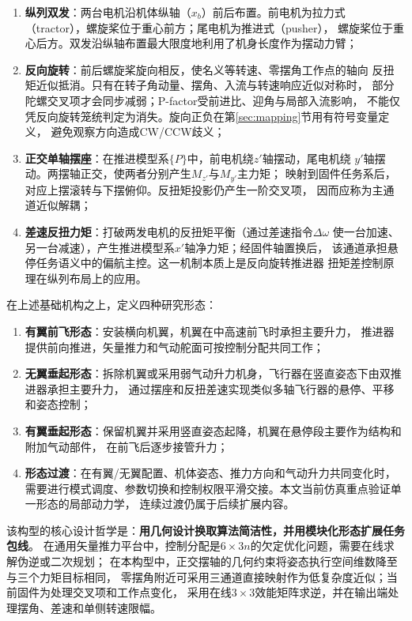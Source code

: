 \begin{enumerate}[label=(\arabic*)]
    \item \textbf{纵列双发}：两台电机沿机体纵轴（$x_b$）前后布置。前电机为拉力式
          （tractor），螺旋桨位于重心前方；尾电机为推进式（pusher），
          螺旋桨位于重心后方。双发沿纵轴布置最大限度地利用了机身长度作为摆动力臂；
    \item \textbf{反向旋转}：前后螺旋桨旋向相反，使名义等转速、零摆角工作点的轴向
          反扭矩近似抵消。只有在转子角动量、摆角、入流与转速响应近似对称时，
          部分陀螺交叉项才会同步减弱；P-factor受前进比、迎角与局部入流影响，
          不能仅凭反向旋转笼统判定为消失。旋向正负在第\ref{sec:mapping}节用有符号变量定义，
          避免观察方向造成CW/CCW歧义；
    \item \textbf{正交单轴摆座}：在推进模型系$\{P\}$中，前电机绕$z'$轴摆动，尾电机绕
          $y'$轴摆动。两摆轴正交，使两者分别产生$M_{z'}$与$M_{y'}$主力矩；
          映射到固件任务系后，对应上摆滚转与下摆俯仰。反扭矩投影仍产生一阶交叉项，
          因而应称为主通道近似解耦；
    \item \textbf{差速反扭力矩}：打破两发电机的反扭矩平衡（通过差速指令$\Delta\omega$
          使一台加速、另一台减速），产生推进模型系$x'$轴净力矩；经固件轴置换后，
          该通道承担悬停任务语义中的偏航主控。这一机制本质上是反向旋转推进器
          扭矩差控制原理在纵列布局上的应用。
\end{enumerate}

在上述基础机构之上，定义四种研究形态：
\begin{enumerate}[label=(\alph*)]
    \item \textbf{有翼前飞形态}：安装横向机翼，机翼在中高速前飞时承担主要升力，
          推进器提供前向推进，矢量推力和气动舵面可按控制分配共同工作；
    \item \textbf{无翼垂起形态}：拆除机翼或采用弱气动升力机身，飞行器在竖直姿态下由双推进器承担主要升力，
          通过摆座和反扭差速实现类似多轴飞行器的悬停、平移和姿态控制；
    \item \textbf{有翼垂起形态}：保留机翼并采用竖直姿态起降，机翼在悬停段主要作为结构和附加气动部件，
          在前飞后逐步接管升力；
    \item \textbf{形态过渡}：在有翼/无翼配置、机体姿态、推力方向和气动升力共同变化时，
          需要进行模式调度、参数切换和控制权限平滑交接。本文当前仿真重点验证单一形态的局部动力学，
          连续过渡仍属于后续扩展内容。
\end{enumerate}

该构型的核心设计哲学是：\textbf{用几何设计换取算法简洁性，并用模块化形态扩展任务包线}。
在通用矢量推力平台中，控制分配是$6 \times 3n$的欠定优化问题，需要在线求解伪逆或二次规划；
在本构型中，正交摆轴的几何约束将姿态执行空间维数降至与三个力矩目标相同，
零摆角附近可采用三通道直接映射作为低复杂度近似；当前固件为处理交叉项和工作点变化，
采用在线$3\times3$效能矩阵求逆，并在输出端处理摆角、差速和单侧转速限幅。

